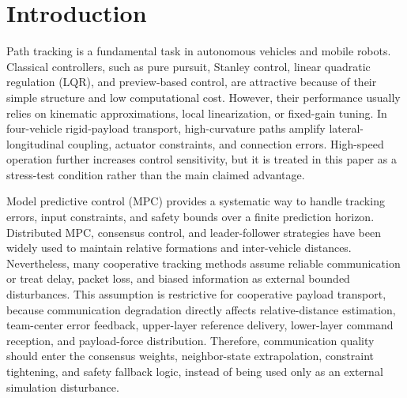 \documentclass[twocolumn,3p,times,procedia]{elsarticle}
\begin{document}
\section{Introduction}

Path tracking is a fundamental task in autonomous vehicles and mobile robots. Classical controllers, such as pure pursuit, Stanley control, linear quadratic regulation (LQR), and preview-based control, are attractive because of their simple structure and low computational cost. However, their performance usually relies on kinematic approximations, local linearization, or fixed-gain tuning. In four-vehicle rigid-payload transport, high-curvature paths amplify lateral-longitudinal coupling, actuator constraints, and connection errors. High-speed operation further increases control sensitivity, but it is treated in this paper as a stress-test condition rather than the main claimed advantage.

Model predictive control (MPC) provides a systematic way to handle tracking errors, input constraints, and safety bounds over a finite prediction horizon. Distributed MPC, consensus control, and leader-follower strategies have been widely used to maintain relative formations and inter-vehicle distances. Nevertheless, many cooperative tracking methods assume reliable communication or treat delay, packet loss, and biased information as external bounded disturbances. This assumption is restrictive for cooperative payload transport, because communication degradation directly affects relative-distance estimation, team-center error feedback, upper-layer reference delivery, lower-layer command reception, and payload-force distribution. Therefore, communication quality should enter the consensus weights, neighbor-state extrapolation, constraint tightening, and safety fallback logic, instead of being used only as an external simulation disturbance.
\end{document}
